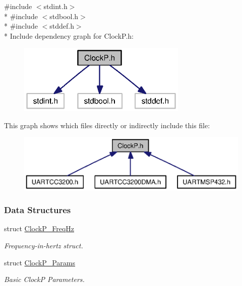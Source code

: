 {\ttfamily \#include $<$stdint.\+h$>$}\\*
{\ttfamily \#include $<$stdbool.\+h$>$}\\*
{\ttfamily \#include $<$stddef.\+h$>$}\\*
Include dependency graph for Clock\+P.\+h\+:
\nopagebreak
\begin{figure}[H]
\begin{center}
\leavevmode
\includegraphics[width=229pt]{_clock_p_8h__incl}
\end{center}
\end{figure}
This graph shows which files directly or indirectly include this file\+:
\nopagebreak
\begin{figure}[H]
\begin{center}
\leavevmode
\includegraphics[width=350pt]{_clock_p_8h__dep__incl}
\end{center}
\end{figure}
\subsubsection*{Data Structures}
\begin{DoxyCompactItemize}
\item 
struct \hyperlink{struct_clock_p___freq_hz}{Clock\+P\+\_\+\+Freq\+Hz}
\begin{DoxyCompactList}\small\item\em Frequency-\/in-\/hertz struct. \end{DoxyCompactList}\item 
struct \hyperlink{struct_clock_p___params}{Clock\+P\+\_\+\+Params}
\begin{DoxyCompactList}\small\item\em Basic Clock\+P Parameters. \end{DoxyCompactList}\end{DoxyCompactItemize}
